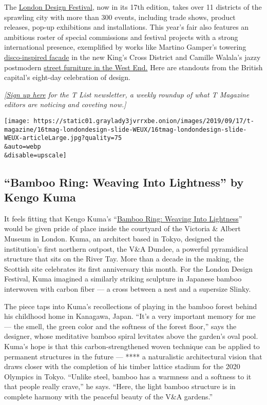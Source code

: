 The \href{https://www.londondesignfestival.com/}{London Design
Festival}, now in its 17th edition, takes over 11 districts of the
sprawling city with more than 300 events, including trade shows, product
releases, pop-up exhibitions and installations. This year's fair also
features an ambitious roster of special commissions and festival
projects with a strong international presence, exemplified by works like
Martino Gamper's towering
\href{https://www.londondesignfestival.com/event/disco-carbonara}{disco-inspired
facade} in the new King's Cross District and Camille Walala's jazzy
postmodern
\href{https://www.londondesignfestival.com/event/walala-lounge}{street
furniture in the West End.} Here are standouts from the British
capital's eight-day celebration of design.

\emph{{[}}\href{https://www.nytimes3xbfgragh.onion/newsletters/t-list?module=inline}{\emph{Sign
up here}} \emph{for the T List newsletter, a weekly roundup of what T
Magazine editors are noticing and coveting now.{]}}

\texttt{[image: https://static01.graylady3jvrrxbe.onion/images/2019/09/17/t-magazine/16tmag-londondesign-slide-WEUX/16tmag-londondesign-slide-WEUX-articleLarge.jpg?quality=75\\\&auto=webp\\\&disable=upscale]}

\hypertarget{bamboo-ring-weaving-into-lightness-by-kengo-kuma}{%
\subsection{``Bamboo Ring: Weaving Into Lightness'' by Kengo
Kuma}\label{bamboo-ring-weaving-into-lightness-by-kengo-kuma}}

It feels fitting that Kengo Kuma's
``\href{http://londondesignfestival.com/event/bamboo-zhu-ring-weaving-lightness}{Bamboo
Ring: Weaving Into Lightness}'' would be given pride of place inside the
courtyard of the Victoria \& Albert Museum in London. Kuma, an architect
based in Tokyo, designed the institution's first northern outpost, the
V\&A Dundee, a powerful pyramidical structure that sits on the River
Tay. More than a decade in the making, the Scottish site celebrates its
first anniversary this month. For the London Design Festival, Kuma
imagined a similarly striking sculpture in Japanese bamboo interwoven
with carbon fiber --- a cross between a nest and a supersize Slinky.

The piece taps into Kuma's recollections of playing in the bamboo forest
behind his childhood home in Kanagawa, Japan. ``It's a very important
memory for me --- the smell, the green color and the softness of the
forest floor,'' says the designer, whose meditative bamboo spiral
levitates above the garden's oval pool. Kuma's hope is that this
carbon-strengthened woven technique can be applied to permanent
structures in the future --- **** a naturalistic architectural vision
that draws closer with the completion of his timber lattice stadium for
the 2020 Olympics in Tokyo. ``Unlike steel, bamboo has a warmness and a
softness to it that people really crave,'' he says. ``Here, the light
bamboo structure is in complete harmony with the peaceful beauty of the
V\&A gardens.''

